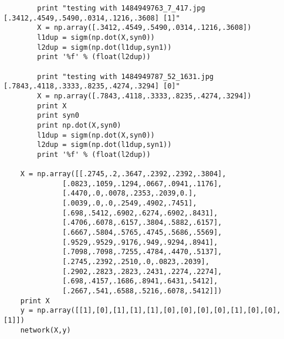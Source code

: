 \documentclass[onecolumn, draftclsnofoot,10pt, compsoc]{IEEEtran}
\begin{document}
\begin{singlespace}
\begin{lstlisting}
		print "testing with 1484949763_7_417.jpg [.3412,.4549,.5490,.0314,.1216,.3608] [1]"
		X = np.array([.3412,.4549,.5490,.0314,.1216,.3608])
		l1dup = sigm(np.dot(X,syn0))
		l2dup = sigm(np.dot(l1dup,syn1))
		print '%f' % (float(l2dup))

		print "testing with 1484949787_52_1631.jpg [.7843,.4118,.3333,.8235,.4274,.3294] [0]"
		X = np.array([.7843,.4118,.3333,.8235,.4274,.3294])
		print X
		print syn0
		print np.dot(X,syn0)
		l1dup = sigm(np.dot(X,syn0))
		l2dup = sigm(np.dot(l1dup,syn1))
		print '%f' % (float(l2dup))

	X = np.array([[.2745,.2,.3647,.2392,.2392,.3804],
			  [.0823,.1059,.1294,.0667,.0941,.1176],
			  [.4470,.0,.0078,.2353,.2039,0.],
			  [.0039,.0,.0,.2549,.4902,.7451],
			  [.698,.5412,.6902,.6274,.6902,.8431],
			  [.4706,.6078,.6157,.3804,.5882,.6157],
			  [.6667,.5804,.5765,.4745,.5686,.5569],
			  [.9529,.9529,.9176,.949,.9294,.8941],
			  [.7098,.7098,.7255,.4784,.4470,.5137],
			  [.2745,.2392,.2510,.0,.0823,.2039],
			  [.2902,.2823,.2823,.2431,.2274,.2274],
			  [.698,.4157,.1686,.8941,.6431,.5412],
			  [.2667,.541,.6588,.5216,.6078,.5412]])
	print X
	y = np.array([[1],[0],[1],[1],[1],[0],[0],[0],[0],[1],[0],[0],[1]])
	network(X,y)
	\end{lstlisting}
	

\end{singlespace}
\end{document}
